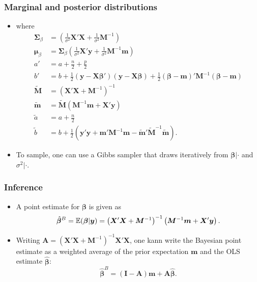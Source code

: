 \documentclass[xcolor=table,10pt]{beamer}
\begin{document}
\begin{frame}
  \frametitle{Marginal and posterior distributions}
  \begin{itemize}
  \item where
    {\footnotesize %
      \begin{align*}
        \bm{\Sigma}_\beta &= \left(\frac{1}{\sigma^2} \bm X'\bm X
                            + \frac{1}{\sigma^2} \bm M^{-1}\right)\\
        \bm{\mu}_\beta &= \bm{\Sigma}_\beta \left(\frac{1}{\sigma^2}
                         \bm X' \bm y + \frac{1}{\sigma^2} \bm
                         M^{-1} \bm m\right)\\
        a' &= a + \frac{n}{2} + \frac{p}{2}\\
        b' &= b + \frac{1}{2} \left(\bm y-\bm X\bm\beta'\right) \left(\bm
             y-\bm X\bm \beta\right) + \frac{1}{2} \left(\bm \beta-\bm
             m\right)' \bm M^{-1} \left(\bm \beta - \bm m\right)\\
        \tilde {\bm M} &= \left(\bm X'\bm X + \bm M^{-1}\right)^{-1}\\
        \tilde {\bm m} &= \tilde {\bm M} \left(\bm M^{-1} \bm m +
                         \bm X'\bm y\right)\\
        \tilde a &= a + \frac{n}{2}\\
        \tilde b &= b + \frac{1}{2}\left(\bm y'\bm y + \bm m'\bm
                   M^{-1}\bm m - \tilde{\bm m}'\tilde{\bm
                   M}^{-1} \tilde{\bm m}\right). 
      \end{align*}
    }
    \vspace*{-\baselineskip}
  \item To sample, one can use a \alert{Gibbs sampler} that draws
    iteratively from $\bm{\beta}|\cdot$ and $\sigma^2|\cdot$.
  \end{itemize}
\end{frame}

  \begin{frame}
  \frametitle{Inference}
  \begin{itemize}
\item A point estimate for $\bm\beta$ is given as
\begin{equation*}
  \hat{\bm\beta}^B = {\mathbb{E}}(\bm\beta|\bm y) = \left(\bm X'\bm X + \bm
    M^{-1}\right)^{-1}  \left(\bm M^{-1} \bm m + \bm X' \bm y\right). 
\end{equation*}
\vspace*{-\baselineskip}
\item Writing $\bm A = (\bm X'\bm X + \bm M^{-1})^{-1} \bm X'\bm X$, one
kann write the Bayesian point estimate as a weighted average of the
prior expectation $\bm m$ and the OLS estimate $\hat{\bm \beta}$:
\begin{equation*}
  \hat{\bm\beta}^B = (\bm I-\bm A)\bm m + \bm A \hat{\bm \beta}. 
\end{equation*}
\end{itemize}
\end{frame}
\end{document}
